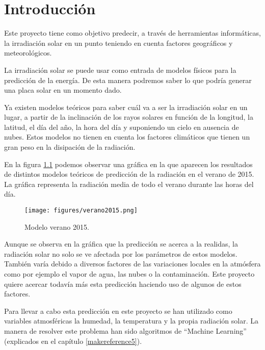 \cleardoublepage

\chapter{Introducción}
\label{makereference1}

Este proyecto tiene como objetivo predecir, a través de herramientas informáticas, la irradiación solar en un punto teniendo en cuenta factores geográficos y meteorológicos.

La irradiación solar se puede usar como entrada de modelos físicos para la predicción de la energía. De esta manera podremos saber lo que podría generar una placa solar en un momento dado.

Ya existen modelos teóricos para saber cuál va a ser la irradiación solar en un lugar, a partir de la inclinación de los rayos solares en función de la longitud, la latitud, el día del año, la hora del día y suponiendo un cielo en ausencia de nubes. Estos modelos no tienen en cuenta los factores climáticos que tienen un gran peso en la disipación de la radiación.

En la figura \ref{modelo_verano} podemos observar una gráfica en la que aparecen los resultados de distintos modelos teóricos de predicción de la radiación en el verano de 2015. La gráfica representa la radiación media de todo el verano durante las horas del día.

\begin{figure}[htb]
	\begin{center}
		\texttt{[image: figures/verano2015.png]}
		\caption{Modelo verano 2015. \label{modelo_verano}} 
	\end{center}
\end{figure}

Aunque se observa en la gráfica que la predicción se acerca a la realidas, la radiación solar no solo se ve afectada por los parámetros de estos modelos. También varía debido a diversos factores de las variaciones locales en la atmósfera como por ejemplo el vapor de agua, las nubes o la contaminación. Este proyecto quiere acercar todavía más esta predicción haciendo uso de algunos de estos factores.

Para llevar a cabo esta predicción en este proyecto se han utilizado como variables atmosféricas la humedad, la temperatura y la propia radiación solar. La manera de resolver este problema han sido algoritmos de ``Machine Learning'' (explicados en el capítulo \ref{makereference5}).

